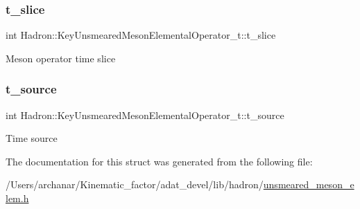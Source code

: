 \subsubsection{\texorpdfstring{t\_slice}{t\_slice}}
{\footnotesize\ttfamily int Hadron\+::\+Key\+Unsmeared\+Meson\+Elemental\+Operator\+\_\+t\+::t\+\_\+slice}

Meson operator time slice \mbox{\label{structHadron_1_1KeyUnsmearedMesonElementalOperator__t_a832a42e8cf448bcaaeb24f8e12ea67ee}} 
\subsubsection{\texorpdfstring{t\_source}{t\_source}}
{\footnotesize\ttfamily int Hadron\+::\+Key\+Unsmeared\+Meson\+Elemental\+Operator\+\_\+t\+::t\+\_\+source}

Time source 

The documentation for this struct was generated from the following file\+:\begin{DoxyCompactItemize}
\item 
/\+Users/archanar/\+Kinematic\+\_\+factor/adat\+\_\+devel/lib/hadron/\mbox{\hyperlink{lib_2hadron_2unsmeared__meson__elem_8h}{unsmeared\+\_\+meson\+\_\+elem.\+h}}\end{DoxyCompactItemize}

